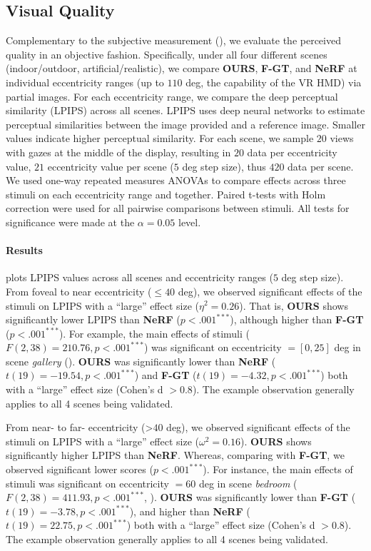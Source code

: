 \subsection{Visual Quality}
\label{sec:study:quality}

Complementary to the subjective measurement (), we evaluate the perceived quality in an objective fashion. Specifically, under all four different scenes (indoor/outdoor, artificial/realistic), we compare {\bf OURS}, {\bf F-GT}, and {\bf NeRF} at individual eccentricity ranges (up to $110$ deg, the capability of the VR HMD) via partial images. 
For each eccentricity range, we compare the deep perceptual similarity (LPIPS) \cite{zhang2018unreasonable} across all scenes. LPIPS uses deep neural networks to estimate perceptual similarities between the image provided and a reference image. Smaller values indicate higher perceptual similarity.
For each scene, we sample $20$ views with gazes at the middle of the display, resulting in $20$ data per eccentricity value, $21$ eccentricity value per scene ($5$ deg step size), thus $420$ data per scene. We used one-way repeated measures ANOVAs to compare effects across three stimuli on each eccentricity range and together. Paired t-tests with Holm correction were used for all pairwise comparisons between stimuli. All tests for significance were made at the $\alpha=0.05$ level. 

\paragraph{Results} 
 plots LPIPS values across all scenes and eccentricity ranges ($5$ deg step size). 
From foveal to near eccentricity ($\leq40$ deg), we observed significant effects of the stimuli on LPIPS with a ``large'' effect size ($\eta^2 = 0.26$). That is, \textbf{OURS} shows significantly lower LPIPS than \textbf{NeRF} ($p<.001^{***}$), although higher than \textbf{F-GT} ($p<.001^{***}$).
For example, the main effects of stimuli ($F(2,38)=210.76, p<.001^{***}$) was significant on eccentricity $=[0,25]$ deg in scene \textit{gallery} (). \textbf{OURS} was significantly lower than \textbf{NeRF} ($t(19)=-19.54, p<.001^{***}$) and \textbf{F-GT} ($t(19)=-4.32, p<.001^{***}$) both with a ``large'' effect size (Cohen's d $>0.8$). The example observation generally applies to all 4 scenes being validated. 

From near- to far- eccentricity (>$40$ deg), we observed significant effects of the stimuli on LPIPS with a ``large'' effect size ($\omega^2 = 0.16$). \textbf{OURS} shows significantly higher LPIPS than \textbf{NeRF}. Whereas, comparing with \textbf{F-GT}, we observed significant lower scores ($p<.001^{***}$).
For instance, the main effects of stimuli was significant on eccentricity $=60$ deg in scene \textit{bedroom} ($F(2,38)=411.93, p<.001^{***}$, ). \textbf{OURS} was significantly lower than \textbf{F-GT} ($t(19)=-3.78, p<.001^{***}$), and higher than \textbf{NeRF} ($t(19)=22.75, p<.001^{***}$) both with a ``large'' effect size (Cohen's d $>0.8$). The example observation generally applies to all 4 scenes being validated. 

